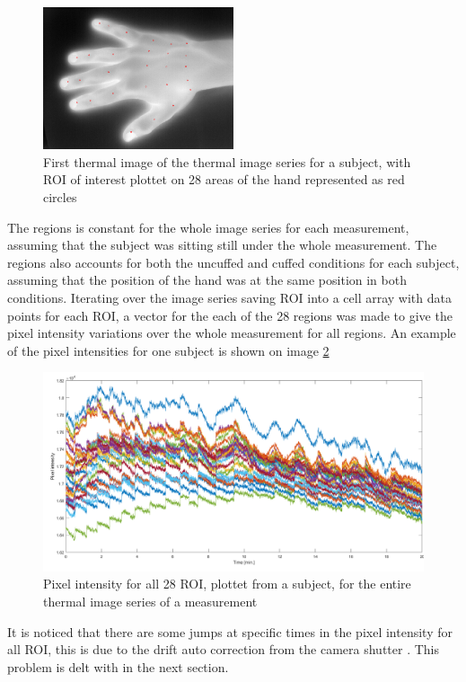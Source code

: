 \begin{figure}[H]
	\includegraphics[width=0.5\textwidth]{figures/roiHand}  %
	\caption{First thermal image of the thermal image series for a subject, with ROI of interest plottet on 28 areas of the hand represented as red circles}
	\label{fig:roiHand}  %
\end{figure}

The regions is constant for the whole image series for each measurement, assuming that the subject was sitting still under the whole measurement. The regions also accounts for both the uncuffed and cuffed conditions for each subject, assuming that the position of the hand was at the same position in both conditions. 
Iterating over the image series saving ROI into a cell array with data points for each ROI, a vector for the each of the 28 regions was made to give the pixel intensity variations over the whole measurement for all regions. 
An example of the pixel intensities for one subject is shown on image \ref{fig:Intensities}

\begin{figure}[H]
	\includegraphics[width=1\textwidth]{figures/Intensities}  %
	\caption{Pixel intensity for all 28 ROI, plottet from a subject, for the entire thermal image series of a measurement}
	\label{fig:Intensities}  %
\end{figure}

It is noticed that there are some jumps at specific times in the pixel intensity for all ROI, this is due to the drift auto correction from the camera shutter . This problem is delt with in the next section. %